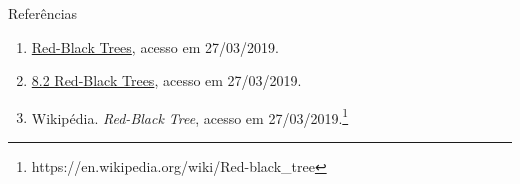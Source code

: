 \begin{frame}[fragile]{Referências}

    \begin{enumerate}
        \item \href{https://www.cs.usfca.edu/~galles/visualization/RedBlack.html}{Red-Black Trees}, acesso em 27/03/2019.

        \item \href{https://www.cs.auckland.ac.nz/software/AlgAnim/red_black.html}{8.2 Red-Black Trees}, acesso em 27/03/2019.

        \item Wikipédia. \textit{Red-Black Tree}, acesso em 27/03/2019.\footnote{https://en.wikipedia.org/wiki/Red-black\_tree}

    \end{enumerate}

\end{frame}
